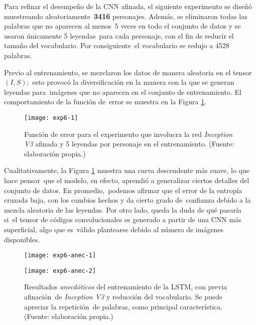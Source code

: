 Para refinar el desempeño de la CNN afinada, el siguiente experimento se diseñó muestreando aleatoriamente\
\textbf{3416} personajes. Además, se eliminaron todas las palabras que no aparecen al menos\
5 veces en todo el conjunto de datos y se usaron únicamente 5 leyendas\
para cada personaje, con el fin de reducir el tamaño del vocabulario. Por consiguiente\
el vocabulario se redujo a 4528 palabras.\par
Previo al entrenamiento, se mezclaron los datos de manera aleatoria en el tensor $(I, S)$;\
esto provocó la diversificación en la manera con la que se generan leyendas para\
imágenes que no aparecen en el conjunto de entrenamiento. El comportamiento de la función de\
error se muestra en la Figura \ref{exp6}.

\begin{figure}[H]
  \texttt{[image: exp6-1]}
  \caption{
    Función de error para el experimento que involucra la red \emph{Inception V3}
    afinada y 5 leyendas por personaje en el entrenamiento.
    (Fuente: elaboración propia.)
  }
  \label{exp6}
\end{figure}

Cualitativamente, la Figura \ref{exp6} muestra una curva descendente más suave, lo que hace pensar\
que el modelo, en efecto, aprendió a generalizar ciertos detalles del conjunto de datos. En promedio,\
podemos afirmar que el error de la entropía cruzada baja, con los cambios hechos y da cierto grado de\
confianza debido a la mezcla aleatoria de las leyendas. Por otro lado, queda la duda de qué pasaría si\
el tensor de códigos convolucionales es generado a partir de una CNN más superficial, algo que es\
válido plantearse debido al número de imágenes disponibles.

\begin{figure}[H]
  \begin{minipage}[c]{\linewidth}
    \texttt{[image: exp6-anec-1]}
  \end{minipage}\hfill
  \begin{minipage}[c]{\linewidth}
    \texttt{[image: exp6-anec-2]}
  \end{minipage}
  \caption{
    Resultados \emph{anecdóticos} del entrenamiento de la LSTM, con previa afinación\
    de \emph{Inception V3} y reducción del vocabulario. Se puede apreciar la repetición\
    de palabras, como principal característica.
    (Fuente: elaboración propia.)
  }
  \label{exp6:anec}
\end{figure}

